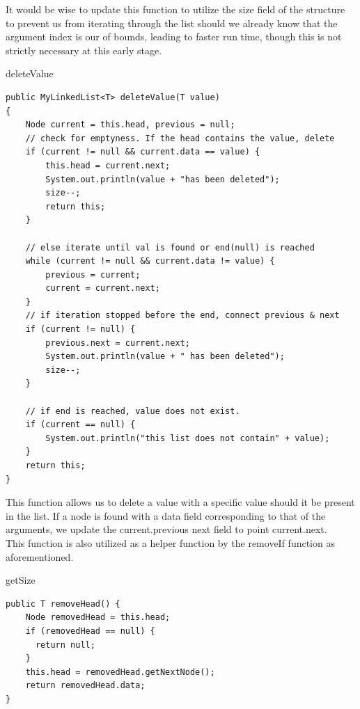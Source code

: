\documentclass[a4paper]{article}
\begin{document}
It would be wise to update this function to utilize the size field
of the structure to prevent us from iterating through the list 
should we already know that the argument index is our of bounds,
leading to faster run time, though this is not strictly
necessary at this early stage.

\newpage

\begin{algorithm}
\caption{deleteValue}\label{euclid}

\begin{verbatim}
public MyLinkedList<T> deleteValue(T value)
{
    Node current = this.head, previous = null;
    // check for emptyness. If the head contains the value, delete
    if (current != null && current.data == value) {
        this.head = current.next; 
        System.out.println(value + "has been deleted");
        size--;
        return this;
    }

    // else iterate until val is found or end(null) is reached
    while (current != null && current.data != value) {
        previous = current;
        current = current.next;
    }
    // if iteration stopped before the end, connect previous & next
    if (current != null) {
        previous.next = current.next;
        System.out.println(value + " has been deleted");
        size--;
    }
    
    // if end is reached, value does not exist. 
    if (current == null) {
        System.out.println("this list does not contain" + value);
    }
    return this;
}
\end{verbatim}
\end{algorithm}

This function allows us to delete a value with a specific value 
should it be present in the list. If a node is found with a 
data field corresponding to that of the arguments, we update 
the current.previous next field to point current.next. \\

This function is also utilized as a helper function by the removeIf
function as aforementioned.

\newpage


\begin{algorithm}
\caption{getSize}\label{euclid}

\begin{verbatim}
public T removeHead() {
    Node removedHead = this.head;
    if (removedHead == null) {
      return null;
    }
    this.head = removedHead.getNextNode();
    return removedHead.data;
}



\end{verbatim}
\end{algorithm}
\end{document}
